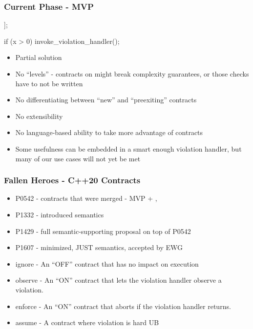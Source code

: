 \begin{frame}[fragile]
  \frametitle{Current Phase - MVP}

  \begin{cppcodebox}
    [[ assert : x > 0 ]];

    if (x > 0) {
      invoke_violation_handler();
    }
  \end{cppcodebox}

  \begin{itemize}
  \item Partial solution
  \item No ``levels'' - contracts on might break complexity guarantees, or
    those checks have to not be written
  \item No differentiating between ``new'' and ``preexiting'' contracts
  \item No extensibility
  \item No language-based ability to take more advantage of contracts
  \item Some usefulness can be embedded in a smart enough violation handler,
    but many of our use cases will not yet be met
  \end{itemize}
\end{frame}

\begin{frame}[fragile]
  \frametitle{Fallen Heroes - C++20 Contracts}

  \begin{itemize}
  \item P0542 - contracts that were merged - MVP + , 
  \item P1332 - introduced semantics
  \item P1429 - full semantic-supporting proposal on top of P0542
  \item P1607 - minimized, JUST semantics, accepted by EWG
  \end{itemize} \pause

  \begin{itemize}
  \item ignore - An ``OFF'' contract that has no impact on execution
  \item observe - An ``ON'' contract that lets the violation handler observe a violation.
  \item enforce - An ``ON'' contract that aborts if the violation handler returns.
  \item assume - A contract where violation is hard UB
  \end{itemize}

\end{frame}

